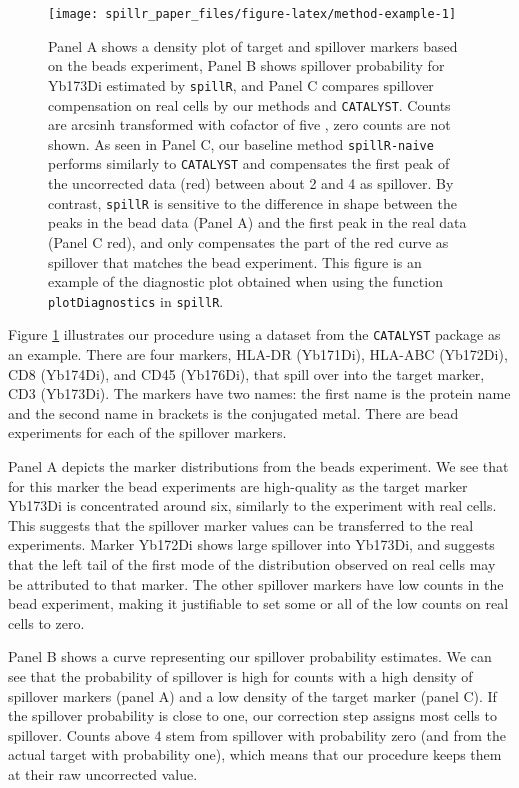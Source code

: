 \documentclass{bioinfo}
\begin{document}
\begin{figure}

{\centering \texttt{[image: spillr\_paper\_files/figure-latex/method-example-1]} 

}

\caption{Panel A shows a density plot of target and spillover markers based on the beads experiment, Panel B shows spillover probability for Yb173Di estimated by \texttt{spillR}, and Panel C compares spillover compensation on real cells by our methods and \texttt{CATALYST}. Counts are arcsinh transformed with cofactor of five \citep{bendall2011single}, zero counts are not shown. As seen in Panel C, our baseline method \texttt{spillR-naive} performs similarly to \texttt{CATALYST} and compensates the first peak of the uncorrected data (red) between about 2 and 4 as spillover. By contrast, \texttt{spillR} is sensitive to the difference in shape between the peaks in the bead data (Panel A) and the first peak in the real data (Panel C red), and only compensates the part of the red curve as spillover that matches the bead experiment. This figure is an example of the diagnostic plot obtained when using the function \texttt{plotDiagnostics} in \texttt{spillR}.}\label{fig:method-example}
\end{figure}

Figure \ref{fig:method-example} illustrates our procedure using a
dataset from the \texttt{CATALYST} package as an example. There are four
markers, HLA-DR (Yb171Di), HLA-ABC (Yb172Di), CD8 (Yb174Di), and CD45
(Yb176Di), that spill over into the target marker, CD3 (Yb173Di). The
markers have two names: the first name is the protein name and the
second name in brackets is the conjugated metal. There are bead
experiments for each of the spillover markers.

Panel A depicts the marker distributions from the beads experiment. We
see that for this marker the bead experiments are high-quality as the
target marker Yb173Di is concentrated around six, similarly to the
experiment with real cells. This suggests that the spillover marker
values can be transferred to the real experiments. Marker Yb172Di shows
large spillover into Yb173Di, and suggests that the left tail of the
first mode of the distribution observed on real cells may be attributed
to that marker. The other spillover markers have low counts in the bead
experiment, making it justifiable to set some or all of the low counts
on real cells to zero.

Panel B shows a curve representing our spillover probability estimates.
We can see that the probability of spillover is high for counts with a
high density of spillover markers (panel A) and a low density of the
target marker (panel C). If the spillover probability is close to one,
our correction step assigns most cells to spillover. Counts above \(4\)
stem from spillover with probability zero (and from the actual target
with probability one), which means that our procedure keeps them at
their raw uncorrected value.
\end{document}
